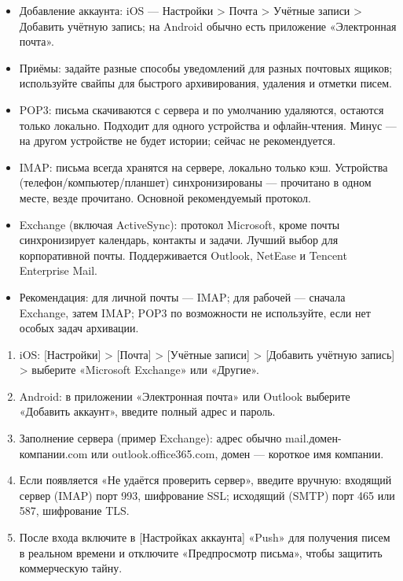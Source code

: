 \begin{itemize}
  \item Добавление аккаунта: iOS — Настройки > Почта > Учётные записи > Добавить учётную запись; на Android обычно есть приложение «Электронная почта».
  \item Приёмы: задайте разные способы уведомлений для разных почтовых ящиков; используйте свайпы для быстрого архивирования, удаления и отметки писем.
\end{itemize}


\begin{itemize}
  \item POP3: письма скачиваются с сервера и по умолчанию удаляются, остаются только локально. Подходит для одного устройства и офлайн-чтения. Минус — на другом устройстве не будет истории; сейчас не рекомендуется.
  \item IMAP: письма всегда хранятся на сервере, локально только кэш. Устройства (телефон/компьютер/планшет) синхронизированы — прочитано в одном месте, везде прочитано. Основной рекомендуемый протокол.
  \item Exchange (включая ActiveSync): протокол Microsoft, кроме почты синхронизирует календарь, контакты и задачи. Лучший выбор для корпоративной почты. Поддерживается Outlook, NetEase и Tencent Enterprise Mail.
  \item Рекомендация: для личной почты — IMAP; для рабочей — сначала Exchange, затем IMAP; POP3 по возможности не используйте, если нет особых задач архивации.
\end{itemize}


\begin{enumerate}
  \item iOS: [Настройки] > [Почта] > [Учётные записи] > [Добавить учётную запись] > выберите «Microsoft Exchange» или «Другие».
  \item Android: в приложении «Электронная почта» или Outlook выберите «Добавить аккаунт», введите полный адрес и пароль.
  \item Заполнение сервера (пример Exchange): адрес обычно mail.домен-компании.com или outlook.office365.com, домен — короткое имя компании.
  \item Если появляется «Не удаётся проверить сервер», введите вручную: входящий сервер (IMAP) порт 993, шифрование SSL; исходящий (SMTP) порт 465 или 587, шифрование TLS.
  \item После входа включите в [Настройках аккаунта] «Push» для получения писем в реальном времени и отключите «Предпросмотр письма», чтобы защитить коммерческую тайну.
\end{enumerate}

